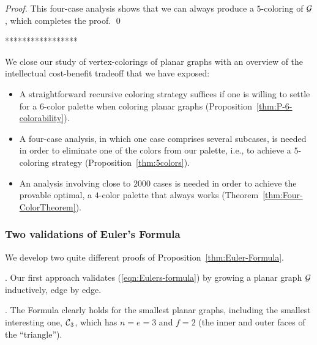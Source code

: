 {\begin{proof}
This four-case analysis shows that we can always produce a
$5$-coloring of $\mbox{$\cal G$}$, which completes the proof.  \qed
\end{proof}
*****************}

\bigskip

We  close our study of vertex-colorings of planar graphs with an overview of the intellectual
cost-benefit tradeoff that we have exposed:
\begin{itemize}
\item
A straightforward recursive coloring strategy suffices if one is
willing to settle for a $6$-color palette when coloring planar graphs
(Proposition~\ref{thm:P-6-colorability}).
\item
A four-case analysis, in which one case comprises several subcases, is
needed in order to eliminate one of the colors from our palette, i.e., to
achieve a $5$-coloring strategy (Proposition~\ref{thm:5colors}).
\item
An analysis involving close to $2000$ cases is needed in order to
achieve the provable optimal, a $4$-color palette that always works
(Theorem~\ref{thm:Four-ColorTheorem}).
\end{itemize}

\subsubsection{Two validations of Euler's Formula}
\label{subsec:validationEulerFormula}

We develop two quite different proofs of Proposition~\ref{thm:Euler-Formula}.

\medskip

. 
Our first approach validates (\ref{eqn:Eulers-formula}) by growing a planar graph $\mbox{$\cal G$}$
inductively, edge by edge.

\smallskip

.
The Formula clearly holds for the smallest planar graphs, including
the smallest interesting one, $\mbox{$\cal C$}_3$, which has $n = e = 3$ and $f =2$
(the inner and outer faces of the ``triangle'').

\smallskip

